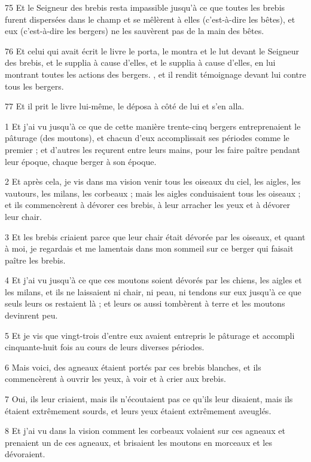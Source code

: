 \par 75 Et le Seigneur des brebis resta impassible jusqu'à ce que toutes les brebis furent dispersées dans le champ et se mêlèrent à elles (c'est-à-dire les bêtes), et eux (c'est-à-dire les bergers) ne les sauvèrent pas de la main des bêtes.
\par 76 Et celui qui avait écrit le livre le porta, le montra et le lut devant le Seigneur des brebis, et le supplia à cause d'elles, et le supplia à cause d'elles, en lui montrant toutes les actions des bergers. , et il rendit témoignage devant lui contre tous les bergers.
\par 77 Et il prit le livre lui-même, le déposa à côté de lui et s'en alla.


\par 1 Et j'ai vu jusqu'à ce que de cette manière trente-cinq bergers entreprenaient le pâturage (des moutons), et chacun d'eux accomplissait ses périodes comme le premier ; et d'autres les reçurent entre leurs mains, pour les faire paître pendant leur époque, chaque berger à son époque.
\par 2 Et après cela, je vis dans ma vision venir tous les oiseaux du ciel, les aigles, les vautours, les milans, les corbeaux ; mais les aigles conduisaient tous les oiseaux ; et ils commencèrent à dévorer ces brebis, à leur arracher les yeux et à dévorer leur chair.
\par 3 Et les brebis criaient parce que leur chair était dévorée par les oiseaux, et quant à moi, je regardais et me lamentais dans mon sommeil sur ce berger qui faisait paître les brebis.
\par 4 Et j'ai vu jusqu'à ce que ces moutons soient dévorés par les chiens, les aigles et les milans, et ils ne laissaient ni chair, ni peau, ni tendons sur eux jusqu'à ce que seuls leurs os restaient là ; et leurs os aussi tombèrent à terre et les moutons devinrent peu.
\par 5 Et je vis que vingt-trois d'entre eux avaient entrepris le pâturage et accompli cinquante-huit fois au cours de leurs diverses périodes.
\par 6 Mais voici, des agneaux étaient portés par ces brebis blanches, et ils commencèrent à ouvrir les yeux, à voir et à crier aux brebis.
\par 7 Oui, ils leur criaient, mais ils n'écoutaient pas ce qu'ils leur disaient, mais ils étaient extrêmement sourds, et leurs yeux étaient extrêmement aveuglés.
\par 8 Et j'ai vu dans la vision comment les corbeaux volaient sur ces agneaux et prenaient un de ces agneaux, et brisaient les moutons en morceaux et les dévoraient.
